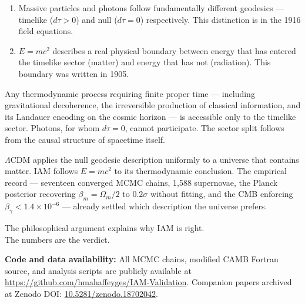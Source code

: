 \documentclass[12pt]{article}
\begin{document}
\begin{enumerate}
\item Massive particles and photons follow fundamentally different
  geodesics — timelike ($d\tau > 0$) and null ($d\tau = 0$)
  respectively. This distinction is in the 1916 field equations.

\item $E = mc^2$ describes a real physical boundary between energy
  that has entered the timelike sector (matter) and energy that has
  not (radiation). This boundary was written in 1905.
\end{enumerate}

Any thermodynamic process requiring finite proper time — including
gravitational decoherence, the irreversible production of classical
information, and its Landauer encoding on the cosmic horizon — is
accessible only to the timelike sector. Photons, for whom $d\tau = 0$,
cannot participate. The sector split follows from the causal structure
of spacetime itself.

$\Lambda$CDM applies the null geodesic description uniformly to a
universe that contains matter. IAM follows $E = mc^2$ to its
thermodynamic conclusion. The empirical record — seventeen converged
MCMC chains, 1,588 supernovae, the Planck posterior recovering
$\beta_m = \Omega_m/2$ to $0.2\sigma$ without fitting, and the CMB
enforcing $\beta_\gamma < 1.4 \times 10^{-6}$ — already settled which
description the universe prefers.

The philosophical argument explains why IAM is right.\\
The numbers are the verdict.

\vspace{12pt}

\noindent\textbf{Code and data availability:}
All MCMC chains, modified CAMB Fortran source, and analysis scripts are
publicly available at
\url{https://github.com/hmahaffeyges/IAM-Validation}.
Companion papers archived at Zenodo DOI:
\href{https://doi.org/10.5281/zenodo.18702042}{10.5281/zenodo.18702042}.
\end{document}
